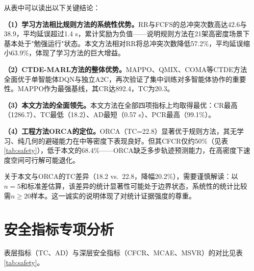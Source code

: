 \documentclass[12pt,a4paper,UTF8]{ctexbook}
\begin{document}
从表中可以读出以下关键结论：

\textbf{（1）学习方法相比规则方法的系统性优势。}RR与FCFS的总冲突次数高达42.6与38.9，平均延误超过1.4 s，累计奖励为负值——说明规则方法在21架高密度场景下基本处于"勉强运行"状态。本文方法相对RR将总冲突次数降低57.2\%，平均延误缩小63.9\%，体现了学习方法的巨大增益。

\textbf{（2）CTDE-MARL方法的整体优势。}MAPPO、QMIX、COMA等CTDE方法全面优于单智能体DQN与独立A2C，再次验证了集中训练对多智能体协作的重要性。MAPPO作为最强基线，其CR达892.4，TC为20.3。

\textbf{（3）本文方法的全面领先。}本文方法在全部四项指标上均取得最优：CR最高（1286.7）、TC最低（18.2）、AD最短（0.57 s）、PCR最高（99.1\%）。

\textbf{（4）工程方法ORCA的定位。}ORCA（TC=22.8）显著优于规则方法，其无学习、纯几何的避碰能力在中等密度下表现良好。但其CFCR仅约50\%（见表\ref{tab:safety}），低于本文的68.4\%——ORCA缺乏多步轨迹预测能力，在高密度下速度空间可行解可能退化。

关于本文与ORCA的TC差异（18.2 vs.\ 22.8，降幅20.2\%），需要谨慎解读：以$n=5$和标准差估算，该差异的统计显著性可能处于边界状态，系统性的统计比较需$n\geq20$样本。这一诚实的说明体现了对统计证据强度的尊重。

\section{安全指标专项分析}

表层指标（TC、AD）与深层安全指标（CFCR、MCAE、MSVR）的对比见表\ref{tab:safety}。
\end{document}
